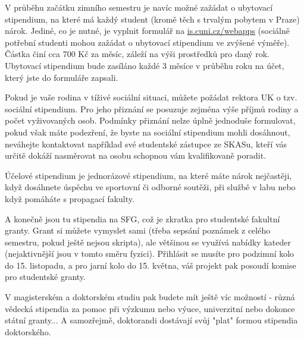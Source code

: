 V průběhu začátku zimního semestru je navíc možné zažádat o ubytovací stipendium, na které má každý student (kromě těch
s trvalým pobytem v Praze) nárok.
Jediné, co je nutné, je vyplnit formulář na \url{is.cuni.cz/webapps} (sociálně potřební studenti mohou zažádat o
ubytovací stipendium ve zvýšené výměře). Částka činí cca 700 Kč za měsíc, záleží na výši prostředků pro daný rok.
Ubytovací stipendium bude zasíláno každé 3 měsíce v průběhu roku na
účet, který jste do formuláře zapsali.

Pokud je vaše rodina v tíživé sociální situaci, můžete požádat rektora UK o tzv. sociální stipendium. Pro jeho přiznání
se posuzuje zejména výše příjmů rodiny a počet vyživovaných osob. Podmínky přiznání nelze úplně jednoduše formulovat,
pokud však máte podezření, že byste na sociální stipendium mohli dosáhnout, neváhejte kontaktovat například své
studentské zástupce ze SKASu, kteří vás určitě dokáží nasměrovat na osobu schopnou vám kvalifikovaně poradit.

Účelové stipendium je jednorázové stipendium, na které máte nárok nejčastěji, když dosáhnete úspěchu ve sportovní či
odborné soutěži, při službě v labu nebo když pomáháte s propagací fakulty.

A konečně jsou tu stipendia na SFG, což je zkratka pro studentské fakultní granty. Grant si můžete vymyslet sami (třeba
sepsání poznámek z celého semestru, pokud ještě nejsou skripta), ale většinou se využívá nabídky kateder (nejaktivnější
jsou v tomto směru fyzici). Přihlásit se musíte pro podzimní kolo do 15. listopadu, a pro jarní kolo do 15. května, váš
projekt pak posoudí komise pro studentské granty.

V magisterském a doktorském studiu pak budete mít ještě víc možností - různá vědecká stipendia za pomoc při výzkumu nebo
výuce, univerzitní nebo dokonce státní granty... A samozřejmě, doktorandi dostávají svůj "plat" formou stipendia
doktorského.